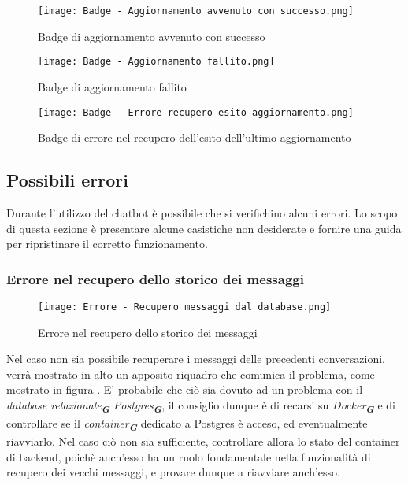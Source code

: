 \newpage

\begin{figure}[h]
    \centering
        \texttt{[image: Badge - Aggiornamento avvenuto con successo.png]}
        \caption{Badge di aggiornamento avvenuto con successo}
        \label{fig:Aggiornamento avvenuto con successo}        
\end{figure}

\begin{figure}[h]
    \centering
        \texttt{[image: Badge - Aggiornamento fallito.png]}
        \caption{Badge di aggiornamento fallito}
        \label{fig:Aggiornamento fallito}
\end{figure}

\begin{figure}[h]
    \centering
        \texttt{[image: Badge - Errore recupero esito aggiornamento.png]}
        \caption{Badge di errore nel recupero dell'esito dell'ultimo aggiornamento}
        \label{fig:Errore nel recupero dell'esito dell'ultimo aggiornamento}
\end{figure}



\newpage

\subsection{Possibili errori}
\label{subsec:possibili_errori}

Durante l'utilizzo del chatbot è possibile che si verifichino alcuni errori. Lo scopo di questa sezione è presentare alcune casistiche non desiderate e fornire una guida per ripristinare il corretto funzionamento.


\subsubsection{Errore nel recupero dello storico dei messaggi}

\begin{figure}[h]
    \centering
        \texttt{[image: Errore - Recupero messaggi dal database.png]}
        \caption{Errore nel recupero dello storico dei messaggi}
        \label{fig:Errore nel recupero dello storico dei messaggi}
\end{figure}

Nel caso non sia possibile recuperare i messaggi delle precedenti conversazioni, verrà mostrato in alto un apposito riquadro che comunica il problema, come mostrato in figura . E' probabile che ciò sia dovuto ad un problema con il \emph{database relazionale}\textsubscript{\textbf{\textit{G}}} \emph{Postgres}\textsubscript{\textbf{\textit{G}}}, il consiglio dunque è di recarsi su \emph{Docker}\textsubscript{\textbf{\textit{G}}} e di controllare se il \emph{container}\textsubscript{\textbf{\textit{G}}} dedicato a Postgres è acceso, ed eventualmente riavviarlo. Nel caso ciò non sia sufficiente, controllare allora lo stato del container di backend, poichè anch'esso ha un ruolo fondamentale nella funzionalità di recupero dei vecchi messaggi, e provare dunque a riavviare anch'esso.


